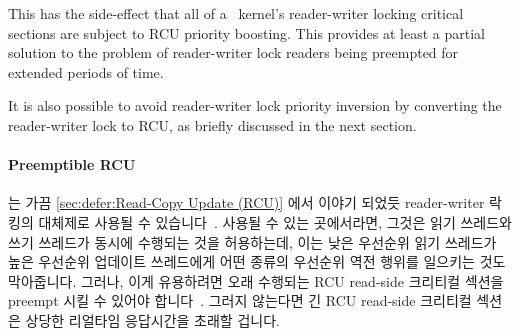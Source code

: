 This has the side-effect that all of a \rt\ kernel's reader-writer locking
critical sections are subject to RCU priority boosting.
This provides at least a partial solution to the problem of reader-writer
lock readers being preempted for extended periods of time.

It is also possible to avoid reader-writer lock priority inversion by
converting the reader-writer lock to RCU, as briefly discussed in the
next section.

\fi

\paragraph{Preemptible RCU}
는 가끔
\cref{sec:defer:Read-Copy Update (RCU)} 에서 이야기 되었듯 reader-writer 락킹의
대체제로 사용될 수
있습니다~\cite{PaulEMcKenney2007WhatIsRCUFundamentally,PaulMcKenney2012RCUUsage,PaulEMcKenney2014RCUAPI}.
사용될 수 있는 곳에서라면, 그것은 읽기 쓰레드와 쓰기 쓰레드가 동시에 수행되는
것을 허용하는데, 이는 낮은 우선순위 읽기 쓰레드가 높은 우선순위 업데이트
쓰레드에게 어떤 종류의 우선순위 역전 행위를 일으키는 것도 막아줍니다.
그러나, 이게 유용하려면 오래 수행되는 RCU read-side 크리티컬 섹션을 preempt
시킬 수 있어야 합니다~\cite{DinakarGuniguntala2008IBMSysJ}.
그러지 않는다면 긴 RCU read-side 크리티컬 섹션은 상당한 리얼타임 응답시간을
초래할 겁니다.


